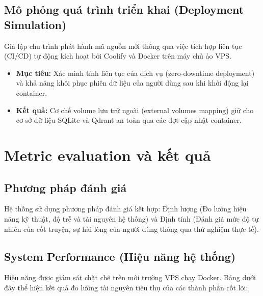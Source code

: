 \documentclass[a4paper]{article}
\begin{document}
\begin{titlepage}
\subsection{Mô phỏng quá trình triển khai (Deployment Simulation)}
Giả lập chu trình phát hành mã nguồn mới thông qua việc tích hợp liên tục (CI/CD) tự động kích hoạt bởi Coolify và Docker trên máy chủ ảo VPS.
\begin{itemize}
    \item \textbf{Mục tiêu:} Xác minh tính liên tục của dịch vụ (zero-downtime deployment) và khả năng khôi phục phiên dữ liệu của người dùng sau khi khởi động lại container.
    \item \textbf{Kết quả:} Cơ chế volume lưu trữ ngoài (external volumes mapping) giữ cho cơ sở dữ liệu SQLite và Qdrant an toàn qua các đợt cập nhật container.
\end{itemize}

\section{Metric evaluation và kết quả}

\subsection{Phương pháp đánh giá}
Hệ thống sử dụng phương pháp đánh giá kết hợp: Định lượng (Đo lường hiệu năng kỹ thuật, độ trễ và tài nguyên hệ thống) và Định tính (Đánh giá mức độ tự nhiên của cốt truyện, sự hài lòng của người dùng thông qua thử nghiệm thực tế).

\subsection{System Performance (Hiệu năng hệ thống)}
Hiệu năng được giám sát chặt chẽ trên môi trường VPS chạy Docker. Bảng dưới đây thể hiện kết quả đo lường tài nguyên tiêu thụ của các thành phần cốt lõi:

\begin{table}[h]
    \centering
    \caption{Đo lường tài nguyên tiêu thụ trên môi trường sản xuất}
    \vspace{0.2cm}
\end{table}


\end{titlepage}
\end{document}
